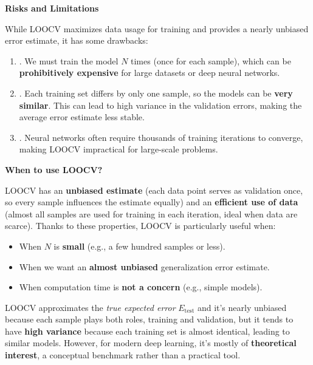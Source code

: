 \highspace
\begin{flushleft}
    \textcolor{Red2}{ \textbf{Risks and Limitations}}
\end{flushleft}
While LOOCV maximizes data usage for training and provides a nearly unbiased error estimate, it has some drawbacks:
\begin{enumerate}
    \item {}. We must train the model $N$ times (once for each sample), which can be \textbf{prohibitively expensive} for large datasets or deep neural networks.
    \item {}. Each training set differs by only one sample, so the models can be \textbf{very similar}. This can lead to high variance in the validation errors, making the average error estimate less stable.
    \item {}. Neural networks often require thousands of training iterations to converge, making LOOCV impractical for large-scale problems.
\end{enumerate}

\newpage

\begin{flushleft}
    \textcolor{Green3}{ \textbf{When to use LOOCV?}}
\end{flushleft}
LOOCV has an \textbf{unbiased estimate} (each data point serves as validation once, so every sample influences the estimate equally) and an \textbf{efficient use of data} (almost all samples are used for training in each iteration, ideal when data are scarce). Thanks to these properties, LOOCV is particularly useful when:
\begin{itemize}
    \item[\textcolor{Green3}{\faIcon{check}}] When $N$ is \textbf{small} (e.g., a few hundred samples or less).
    \item[\textcolor{Green3}{\faIcon{check}}] When we want an \textbf{almost unbiased} generalization error estimate.
    \item[\textcolor{Green3}{\faIcon{check}}] When computation time is \textbf{not a concern} (e.g., simple models).
\end{itemize}
LOOCV approximates the \emph{true expected error} $E_{\text{test}}$ and it's nearly unbiased because each sample plays both roles, training and validation, but it tends to have \textbf{high variance} because each training set is almost identical, leading to similar models. However, for modern deep learning, it's mostly of \textbf{theoretical interest}, a conceptual benchmark rather than a practical tool.